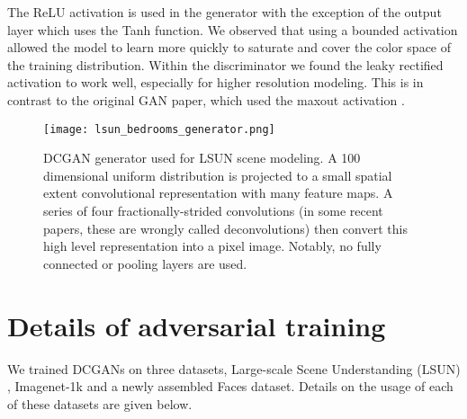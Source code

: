 \documentclass{article} \usepackage{iclr2016_conference,times}
\begin{document}
The ReLU activation \citep{nair2010rectified} is used in the generator with the exception of the output layer which uses the Tanh function. We observed that using a bounded activation allowed the model to learn more quickly to saturate and cover the color space of the training distribution. Within the discriminator we found the leaky rectified activation \citep{maas2013rectifier} \citep{xu2015empirical} to work well, especially for higher resolution modeling. This is in contrast to the original GAN paper, which used the maxout activation \citep{goodfellow2013maxout}.


\begin{figure}[h]
\begin{center}
\texttt{[image: lsun\_bedrooms\_generator.png]}
\end{center}
\caption{\label{fig_LSUN_architecture}DCGAN generator used for LSUN scene modeling. A 100 dimensional uniform distribution  is projected to a small spatial extent convolutional representation with many feature maps. A series of four fractionally-strided convolutions (in some recent papers, these are wrongly called deconvolutions) then convert this high level representation into a  pixel image. Notably, no fully connected or pooling layers are used.}
\end{figure}

\section{Details of adversarial training}

We trained DCGANs on three datasets, Large-scale Scene Understanding (LSUN) \citep{yu2015construction}, Imagenet-1k and a newly assembled Faces dataset. Details on the usage of each of these datasets are given below.
\end{document}
